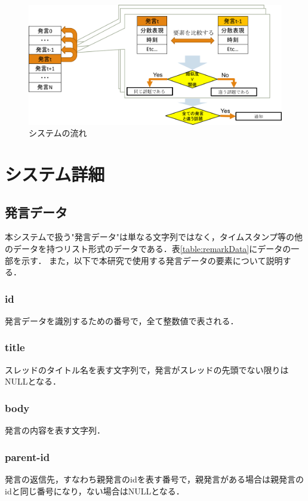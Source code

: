 \begin{figure}[htbp]
 \begin{center}
  \includegraphics[width=\textwidth]{../images/3.The_Model/WholeModel.png}
  \caption{システムの流れ}
  \label{Fig:wholeModel}
  \vspace{-10pt}
 \end{center}
\end{figure}

\section{システム詳細}
\label{model:detail}
\subsection{発言データ}
本システムで扱う"発言データ"は単なる文字列ではなく，タイムスタンプ等の他のデータを持つリスト形式のデータである．表\ref{table:remarkData}にデータの一部を示す．
また，以下で本研究で使用する発言データの要素について説明する．
\subsubsection*{ id}
発言データを識別するための番号で，全て整数値で表される．
\subsubsection*{ title}
スレッドのタイトル名を表す文字列で，発言がスレッドの先頭でない限りはNULLとなる．
\subsubsection*{ body}
発言の内容を表す文字列．
\subsubsection*{ parent-id}
発言の返信先，すなわち親発言のidを表す番号で，親発言がある場合は親発言のidと同じ番号になり，ない場合はNULLとなる．
